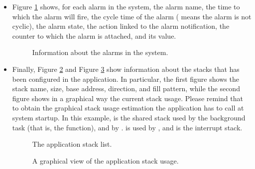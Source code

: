 \begin{itemize}
\item Figure \ref{fig:trace32_alarm} shows, for each alarm in the
  system, the alarm name, the time to which the alarm will fire, the
  cycle time of the alarm ( means the alarm is not cyclic),
  the alarm state, the action linked to the alarm notification, the
  counter to which the alarm is attached, and its value.
%
\begin{figure}
\caption{\label{fig:trace32_alarm} Information about the alarms in the system.}
\end{figure}
%

\item Finally, Figure \ref{fig:trace32_stack} and Figure
  \ref{fig:trace32_stackview} show information about the stacks that
  has been configured in the application. In particular, the first
  figure shows the stack name, size, base address, direction, and fill
  pattern, while the second figure shows in a graphical way the
  current stack usage. Please remind that to obtain the graphical
  stack usage estimation the application has to call
   at system startup. In this example,
   is the shared stack used by the background task (that
  is, the  function), and by .  is used
  by , and  is the interrupt stack.
%
\begin{figure}
\caption{\label{fig:trace32_stack} The application stack list.}
\end{figure}
%
\begin{figure}
\caption{\label{fig:trace32_stackview} A graphical view of the
application stack usage.}
\end{figure}

\end{itemize}


